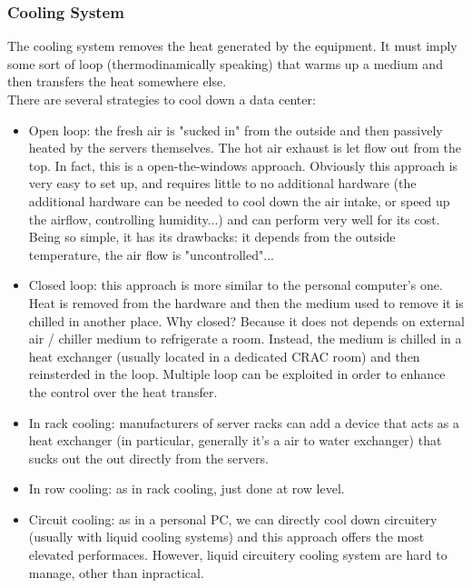 \documentclass{article}
\begin{document}
				\subsubsection{Cooling System}
					The cooling system removes the heat generated by the equipment. It must imply some sort of loop (thermodinamically speaking) that warms up a medium and then transfers the heat somewhere else.\\
					There are several strategies to cool down a data center:
					\begin{itemize}
						\item Open loop: the fresh air is "sucked in" from the outside and then passively heated by the servers themselves. The hot air exhaust is let flow out from the top. In fact, this is a open-the-windows approach. Obviously this approach is very easy to set up, and requires little to no additional hardware (the additional hardware can be needed to cool down the air intake, or speed up the airflow, controlling humidity...) and can perform very well for its cost. Being so simple, it has its drawbacks: it depends from the outside temperature, the air flow is "uncontrolled"...
						\item Closed loop: this approach is more similar to the personal computer's one. Heat is removed from the hardware and then the medium used to remove it is chilled in another place. Why closed? Because it does not depends on external air / chiller medium to refrigerate a room. Instead, the medium is chilled in a heat exchanger (usually located in a dedicated CRAC room) and then reinsterded in the loop. Multiple loop can be exploited in order to enhance the control over the heat transfer.
						\item In rack cooling: manufacturers of server racks can add a device that acts as a heat exchanger (in particular, generally it's a air to water exchanger) that sucks out the out directly from the servers.
						\item In row cooling: as in rack cooling, just done at row level.
						\item Circuit cooling: as in a personal PC, we can directly cool down circuitery (usually with liquid cooling systems) and this approach offers the most elevated performaces. However, liquid circuitery cooling system are hard to manage, other than inpractical.
					\end{itemize}
					
\end{document}
